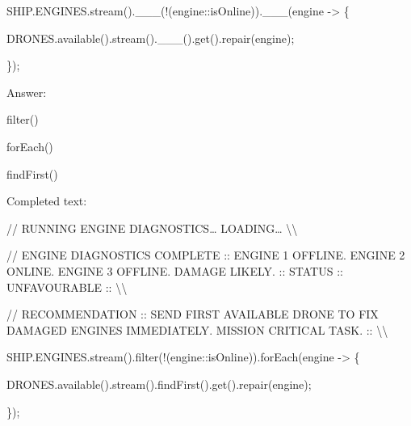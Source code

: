 \documentclass[
]{article}
\begin{document}
SHIP.ENGINES.stream().\_\_\_(!(engine::isOnline)).\_\_\_(engine
-\textgreater{} \{

DRONES.available().stream().\_\_\_().get().repair(engine);

\});

Answer:

filter()

forEach()

findFirst()

Completed text:

// RUNNING ENGINE DIAGNOSTICS\ldots{} LOADING\ldots{}
\textbackslash\textbackslash{}

// ENGINE DIAGNOSTICS COMPLETE :: ENGINE 1 OFFLINE. ENGINE 2 ONLINE.
ENGINE 3 OFFLINE. DAMAGE LIKELY. :: STATUS :: UNFAVOURABLE ::
\textbackslash\textbackslash{}

// RECOMMENDATION :: SEND FIRST AVAILABLE DRONE TO FIX DAMAGED ENGINES
IMMEDIATELY. MISSION CRITICAL TASK. :: \textbackslash\textbackslash{}

SHIP.ENGINES.stream().filter(!(engine::isOnline)).forEach(engine
-\textgreater{} \{

DRONES.available().stream().findFirst().get().repair(engine);

\});
\end{document}
